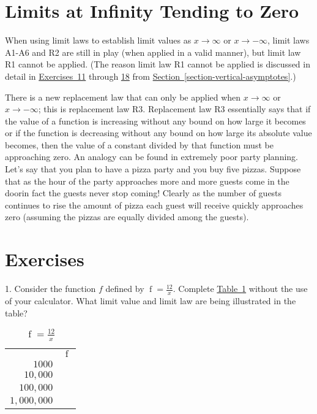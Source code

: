 \documentclass[12pt,]{book}
\theoremstyle{plain}
\theoremstyle{definition}
\numberwithin{equation}{section}
\newcommand{\hrulemedium}{\noalign{\hrule height 0.07em}}
\newcommand{\hrulethick} {\noalign{\hrule height 0.11em}}
\providecommand\phantomsection{}
\newcommand{\fe}[2]{\mathop{{#1}{\left(#2\right)}}}
\begin{document}
\section[Limits at Infinity Tending to Zero]{Limits at Infinity Tending to Zero}\label{section-limits-at-infinity-tending-to-zero}
When using limit laws to establish limit values as \(x\to\infty\) or \(x\to-\infty\), limit laws A1-A6 and R2 are still in play (when applied in a valid manner), but limit law R1 cannot be applied. (The reason limit law R1 cannot be applied is discussed in detail in \hyperref[exercise-hear-me-first]{Exercises~11} through \hyperref[exercise-hear-me-last]{18} from \hyperref[section-vertical-asymptotes]{Section~\ref*{section-vertical-asymptotes}}.)%
\par
There is a new replacement law that can only be applied when \(x\to\infty\) or \(x\to-\infty\); this is replacement law R3. Replacement law R3 essentially says that if the value of a function is increasing without any bound on how large it becomes or if the function is decreasing without any bound on how large its absolute value becomes, then the value of a constant divided by that function must be approaching zero. An analogy can be found in extremely poor party planning. Let's say that you plan to have a pizza party and you buy five pizzas. Suppose that as the hour of the party approaches more and more guests come in the door\textemdash{}in fact the guests never stop coming! Clearly as the number of guests continues to rise the amount of pizza each guest will receive quickly approaches zero (assuming the pizzas are equally divided among the guests).%
\typeout{************************************************}
\typeout{************************************************}
\section*{Exercises}\label{exercises-8}

\begin{exerciselist}
\item[1.]\phantomsection\hypertarget{exercise-69}{\null}Consider the function \(f\) defined by \(\fe{f}{x}=\frac{12}{x}\). Complete \hyperref[table-limit-to-zero]{Table~\ref*{table-limit-to-zero}} without the use of your calculator. What limit value and limit law are being illustrated in the table?%
\begin{table}
\centering
\caption{\(\fe{f}{x}=\frac{12}{x}\)\label{table-limit-to-zero}}
\begin{tabular}{rl}\hrulethick
\multicolumn{1}{c}{\(x\)}&\multicolumn{1}{c}{\(\fe{f}{x}\)}\\\hrulemedium
\(1000\)&\\
\(10{,}000\)&\\
\(100{,}000\)&\\
\(1{,}000{,}000\)&
\end{tabular}
\end{table}
\par\smallskip
\end{exerciselist}
\typeout{************************************************}
\typeout{************************************************}
\end{document}
